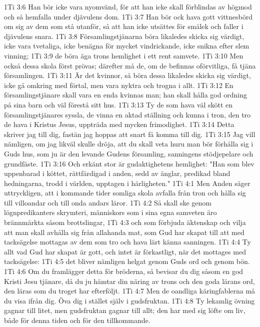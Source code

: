 1Ti 3:6  Han bör icke vara nyomvänd, för att han icke skall förblindas av högmod och så hemfalla under djävulens dom.
1Ti 3:7  Han bör ock hava gott vittnesbörd om sig av dem som stå utanför, så att han icke utsättes för smälek och faller i djävulens snara.
1Ti 3:8  Församlingstjänarna böra likaledes skicka sig värdigt, icke vara tvetaliga, icke benägna för mycket vindrickande, icke snikna efter slem vinning;
1Ti 3:9  de böra äga trons hemlighet i ett rent samvete.
1Ti 3:10  Men också dessa skola först prövas; därefter må de, om de befinnas oförvitliga, få tjäna församlingen.
1Ti 3:11  Är det kvinnor, så böra dessa likaledes skicka sig värdigt, icke gå omkring med förtal, men vara nyktra och trogna i allt.
1Ti 3:12  En församlingstjänare skall vara en enda kvinnas man; han skall hålla god ordning på sina barn och väl förestå sitt hus.
1Ti 3:13  Ty de som hava väl skött en församlingstjänares syssla, de vinna en aktad ställning och kunna i tron, den tro de hava i Kristus Jesus, uppträda med mycken frimodighet.
1Ti 3:14  Detta skriver jag till dig, fastän jag hoppas att snart få komma till dig.
1Ti 3:15  Jag vill nämligen, om jag likväl skulle dröja, att du skall veta huru man bör förhålla sig i Guds hus, som ju är den levande Gudens församling, sanningens stödjepelare och grundfäste.
1Ti 3:16  Och erkänt stor är gudaktighetens hemlighet: "Han som blev uppenbarad i köttet, rättfärdigad i anden, sedd av änglar, predikad bland hedningarna, trodd i världen, upptagen i härligheten."
1Ti 4:1  Men Anden säger uttryckligen, att i kommande tider somliga skola avfalla från tron och hålla sig till villoandar och till onda andars läror.
1Ti 4:2  Så skall ske genom lögnpredikanters skrymteri, människors som i sina egna samveten äro brännmärkta såsom brottslingar,
1Ti 4:3  och som förbjuda äktenskap och vilja att man skall avhålla sig från allahanda mat, som Gud har skapat till att med tacksägelse mottagas av dem som tro och hava lärt känna sanningen.
1Ti 4:4  Ty allt vad Gud har skapat är gott, och intet är förkastligt, när det mottages med tacksägelse:
1Ti 4:5  det bliver nämligen helgat genom Guds ord och genom bön.
1Ti 4:6  Om du framlägger detta för bröderna, så bevisar du dig såsom en god Kristi Jesu tjänare, då du ju hämtar din näring av trons och den goda lärans ord, den läras som du troget har efterföljt.
1Ti 4:7  Men de oandliga käringfablerna må du visa ifrån dig. Öva dig i stället själv i gudsfruktan.
1Ti 4:8  Ty lekamlig övning gagnar till litet, men gudsfruktan gagnar till allt; den har med sig löfte om liv, både för denna tiden och för den tillkommande.
